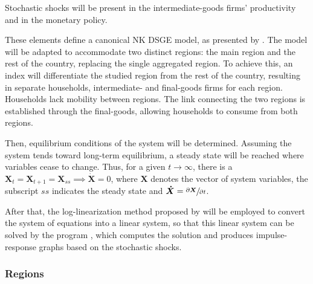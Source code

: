 \documentclass[../thesis.tex]{subfiles}
\begin{document}
	Stochastic shocks will be present in the intermediate-goods firms' productivity and in the monetary policy.
	
	
	These elements define a canonical NK DSGE model, as presented by \cite{solis-garcia_ucb_2022}. The model will be adapted to accommodate two distinct regions: the main region and the rest of the country, replacing the single aggregated region. To achieve this, an index will differentiate the studied region from the rest of the country, resulting in separate households, intermediate- and final-goods firms for each region. Households lack mobility between regions. The link connecting the two regions is established through the final-goods, allowing households to consume from both regions.

	Then, equilibrium conditions of the system will be determined. Assuming the system tends toward long-term equilibrium, a steady state will be reached where variables cease to change. Thus, for a given $t \to \infty$, there is a $\boldsymbol{X}_t = \boldsymbol{X}_{t+1} = \boldsymbol{X}_{ss} \implies \boldsymbol{\dot{X}} = 0$, where $\boldsymbol{X}$ denotes the vector of system variables, the subscript $ss$ indicates the steady state and $\boldsymbol{\dot{X}} = \sfrac{\partial \boldsymbol{X}}{\partial t}$. 
	
	After that, the log-linearization method proposed by \textcite{uhlig_toolkit_1999} will be employed to convert the system of equations into a linear system, so that this linear system can be solved by the program \dynare{}, which computes the solution and produces impulse-response graphs based on the stochastic shocks.

	
\subsubsection{Regions}\label{sec_v6:regions}
\end{document}
